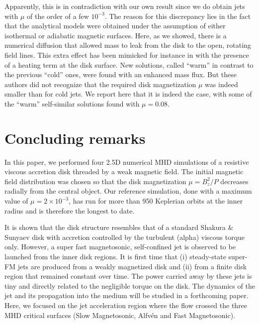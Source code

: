 \documentclass{aa}
\begin{document}
Apparently, this is in contradiction with our own result since we do obtain jets with $\mu$ of the order of a few $10^{-3}$. The reason for this discrepancy lies in the fact that the analytical models
were obtained under the assumption of either isothermal or adiabatic magnetic surfaces. Here, as we showed, there is a numerical diffusion that allowed mass to leak from the disk to the open, rotating
field lines. This extra effect has been mimicked for instance in \citet{2000A&A...361.1178C} with the presence of a heating term at the disk surface. New solutions, called ``warm'' in contrast to the
previous ``cold'' ones, were found with an enhanced mass flux. But these authors did not recognize that the required disk magnetization $\mu$ was indeed smaller than for cold jets.  We report here
that it is indeed the case, with some of the ``warm'' self-similar solutions found with $\mu=0.08$.




\section{Concluding remarks}
\label{ConcludingRemarks}



In this paper, we performed four 2.5D numerical MHD simulations of a resistive viscous accretion disk threaded by a weak magnetic field. The initial magnetic field distribution was chosen so that the
disk magnetization $\mu= B_z^2/ P$ decreases radially from the central object. Our reference simulation, done with a maximum value of $\mu= 2\times 10^{-3}$, has run for more than 950 Keplerian orbits
at the inner radius and is therefore the longest to date.

It is shown that the disk structure resembles that of a standard Shakura \& Sunyaev disk with accretion controlled by the turbulent (alpha) viscous torque only. However, a super fast magnetosonic,
self-confined jet is observed to be launched from the inner disk regions. It is first time that (i) steady-state super-FM jets are produced from a weakly magnetized disk and (ii) from a finite disk
region that remained constant over time. The power carried away by these jets is tiny and directly related to the negligible torque on the disk. The dynamics of the jet and its propagation into the
medium will be studied in a forthcoming paper. Here, we focused on the jet acceleration region where the flow crossed the three MHD critical surfaces (Slow Magnetosonic, Alfv\'en and Fast
Magnetosonic).
\end{document}
